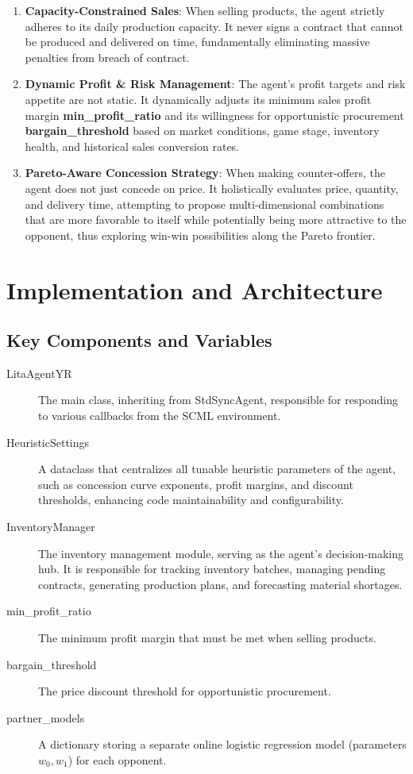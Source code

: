 \documentclass[12pt, a4paper]{article}
\begin{document}
\begin{enumerate}
\item \textbf{Capacity-Constrained Sales}: When selling products, the agent strictly adheres to its daily production capacity. It never signs a contract that cannot be produced and delivered on time, fundamentally eliminating massive penalties from breach of contract.

\item \textbf{Dynamic Profit \& Risk Management}: The agent's profit targets and risk appetite are not static. It dynamically adjusts its minimum sales profit margin \textbf{min\_profit\_ratio} and its willingness for opportunistic procurement \textbf{bargain\_threshold} based on market conditions, game stage, inventory health, and historical sales conversion rates.

\item \textbf{Pareto-Aware Concession Strategy}: When making counter-offers, the agent does not just concede on price. It holistically evaluates price, quantity, and delivery time, attempting to propose multi-dimensional combinations that are more favorable to itself while potentially being more attractive to the opponent, thus exploring win-win possibilities along the Pareto frontier.
\end{enumerate}

\section{Implementation and Architecture}
\subsection{Key Components and Variables}
\begin{description}
\item[LitaAgentYR] The main class, inheriting from StdSyncAgent, responsible for responding to various callbacks from the SCML environment.
\item[HeuristicSettings] A dataclass that centralizes all tunable heuristic parameters of the agent, such as concession curve exponents, profit margins, and discount thresholds, enhancing code maintainability and configurability.
\item[InventoryManager] The inventory management module, serving as the agent's decision-making hub. It is responsible for tracking inventory batches, managing pending contracts, generating production plans, and forecasting material shortages.
\item[min\_profit\_ratio] The minimum profit margin that must be met when selling products.
\item[bargain\_threshold] The price discount threshold for opportunistic procurement.
\item[partner\_models] A dictionary storing a separate online logistic regression model (parameters $w_0, w_1$) for each opponent.
\end{description}
\end{document}
